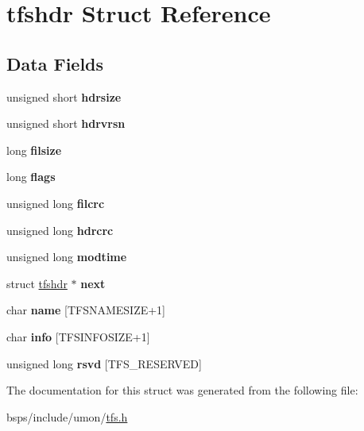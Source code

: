 \hypertarget{structtfshdr}{}\section{tfshdr Struct Reference}
\label{structtfshdr}
\subsection*{Data Fields}
\begin{DoxyCompactItemize}
\item 
\mbox{\label{structtfshdr_a6a1fd6527c3472e85f6c3ff83d7c0f41}} 
unsigned short {\bfseries hdrsize}
\item 
\mbox{\label{structtfshdr_a55d98181a2db6c6ee31915f60ad32bbc}} 
unsigned short {\bfseries hdrvrsn}
\item 
\mbox{\label{structtfshdr_ac9bc0f6003a9267545e9ab1bc03e23e4}} 
long {\bfseries filsize}
\item 
\mbox{\label{structtfshdr_a966456d46c51eb6a1dbbd78e87e4c567}} 
long {\bfseries flags}
\item 
\mbox{\label{structtfshdr_a0c73977e7b31b1998b439ea9edfe969b}} 
unsigned long {\bfseries filcrc}
\item 
\mbox{\label{structtfshdr_af42c60f419c0a1fb77637bec8acf759b}} 
unsigned long {\bfseries hdrcrc}
\item 
\mbox{\label{structtfshdr_aeefe7e9be3e7d1b37a93d4a608a3bb63}} 
unsigned long {\bfseries modtime}
\item 
\mbox{\label{structtfshdr_a2bd62dc94eb3beeb7b158b1e14417243}} 
struct \mbox{\hyperlink{structtfshdr}{tfshdr}} $\ast$ {\bfseries next}
\item 
\mbox{\label{structtfshdr_a0d825e54eff2597fe268efc108d09120}} 
char {\bfseries name} \mbox{[}T\+F\+S\+N\+A\+M\+E\+S\+I\+ZE+1\mbox{]}
\item 
\mbox{\label{structtfshdr_aff90e4a9aab45fe1f9b7bd9b506ae061}} 
char {\bfseries info} \mbox{[}T\+F\+S\+I\+N\+F\+O\+S\+I\+ZE+1\mbox{]}
\item 
\mbox{\label{structtfshdr_a241b04e73aef944aa44a3f8866aad985}} 
unsigned long {\bfseries rsvd} \mbox{[}T\+F\+S\+\_\+\+R\+E\+S\+E\+R\+V\+ED\mbox{]}
\end{DoxyCompactItemize}


The documentation for this struct was generated from the following file\+:\begin{DoxyCompactItemize}
\item 
bsps/include/umon/\mbox{\hyperlink{tfs_8h}{tfs.\+h}}\end{DoxyCompactItemize}
